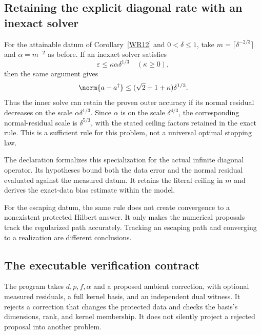 \subsection{Retaining the explicit diagonal rate with an inexact solver}
For the attainable datum of Corollary~\ref{WR12} and $0<\delta\le1$, take $m=\lceil\delta^{-2/3}\rceil$ and $\alpha=m^{-2}$ as before. If an inexact solver satisfies
\[
 \varepsilon\le\kappa\alpha\delta^{1/3}
 \quad(\kappa\ge0),
\]
then the same argument gives
\[
 \norm{a-a^\dagger}\le(\sqrt2+1+\kappa)\delta^{1/3}.
\]
Thus the inner solve can retain the proven outer accuracy if its normal residual decreases on the scale $\alpha\delta^{1/3}$. Since $\alpha$ is on the scale $\delta^{4/3}$, the corresponding normal-residual scale is $\delta^{5/3}$, with the stated ceiling factors retained in the exact rule. This is a sufficient rule for this problem, not a universal optimal stopping law.

The declaration  formalizes this specialization for the actual infinite diagonal operator. Its hypotheses bound both the data error and the normal residual evaluated against the measured datum. It retains the literal ceiling in $m$ and derives the exact-data bias estimate within the model.


For the escaping datum, the same rule does not create convergence to a nonexistent protected Hilbert answer. It only makes the numerical proposals track the regularized path accurately. Tracking an escaping path and converging to a realization are different conclusions.

\subsection{The executable verification contract}
The program takes $d,p,f,\alpha$ and a proposed ambient correction, with optional measured residuals, a full kernel basis, and an independent dual witness. It rejects a correction that changes the protected data and checks the basis's dimensions, rank, and kernel membership. It does not silently project a rejected proposal into another problem.

